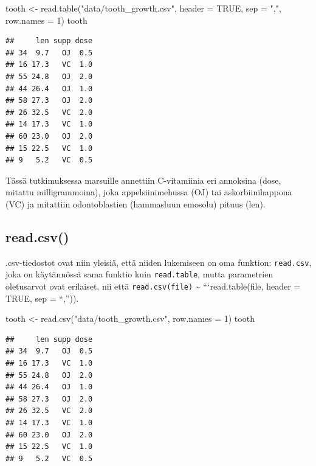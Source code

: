 \documentclass[
]{book}
\newenvironment{Shaded}{\begin{snugshade}}{\end{snugshade}}
\newcommand{\AttributeTok}[1]{\textcolor[rgb]{0.77,0.63,0.00}{#1}}
\newcommand{\ConstantTok}[1]{\textcolor[rgb]{0.00,0.00,0.00}{#1}}
\newcommand{\DecValTok}[1]{\textcolor[rgb]{0.00,0.00,0.81}{#1}}
\newcommand{\FunctionTok}[1]{\textcolor[rgb]{0.00,0.00,0.00}{#1}}
\newcommand{\NormalTok}[1]{#1}
\newcommand{\OtherTok}[1]{\textcolor[rgb]{0.56,0.35,0.01}{#1}}
\newcommand{\StringTok}[1]{\textcolor[rgb]{0.31,0.60,0.02}{#1}}
\begin{document}
\begin{Shaded}
\begin{Highlighting}[]
\NormalTok{tooth }\OtherTok{\textless{}{-}} \FunctionTok{read.table}\NormalTok{(}\StringTok{"data/tooth\_growth.csv"}\NormalTok{, }\AttributeTok{header =} \ConstantTok{TRUE}\NormalTok{, }\AttributeTok{sep =} \StringTok{","}\NormalTok{, }\AttributeTok{row.names =} \DecValTok{1}\NormalTok{)}
\NormalTok{tooth}
\end{Highlighting}
\end{Shaded}

\begin{verbatim}
##     len supp dose
## 34  9.7   OJ  0.5
## 16 17.3   VC  1.0
## 55 24.8   OJ  2.0
## 44 26.4   OJ  1.0
## 58 27.3   OJ  2.0
## 26 32.5   VC  2.0
## 14 17.3   VC  1.0
## 60 23.0   OJ  2.0
## 15 22.5   VC  1.0
## 9   5.2   VC  0.5
\end{verbatim}

Tässä tutkimuksessa marsuille annettiin C-vitamiinia eri annoksina (dose, mitattu milligrammoina), joka appelsiinimehussa (OJ) tai askorbiinihappona (VC) ja mitattiin odontoblastien (hammasluun emosolu) pituus (len).

\hypertarget{read.csv}{%
\subsection{read.csv()}\label{read.csv}}

.csv-tiedostot ovat niin yleisiä, että niiden lukemiseen on oma funktion: \texttt{read.csv}, joka on käytännössä sama funktio kuin \texttt{read.table}, mutta parametrien oletusarvot ovat erilaiset, nii että \texttt{read.csv(file)} \textasciitilde{} ```read.table(file, header = TRUE, sep = ``,'')).

\begin{Shaded}
\begin{Highlighting}[]
\NormalTok{tooth }\OtherTok{\textless{}{-}} \FunctionTok{read.csv}\NormalTok{(}\StringTok{"data/tooth\_growth.csv"}\NormalTok{, }\AttributeTok{row.names =} \DecValTok{1}\NormalTok{)}
\NormalTok{tooth}
\end{Highlighting}
\end{Shaded}

\begin{verbatim}
##     len supp dose
## 34  9.7   OJ  0.5
## 16 17.3   VC  1.0
## 55 24.8   OJ  2.0
## 44 26.4   OJ  1.0
## 58 27.3   OJ  2.0
## 26 32.5   VC  2.0
## 14 17.3   VC  1.0
## 60 23.0   OJ  2.0
## 15 22.5   VC  1.0
## 9   5.2   VC  0.5
\end{verbatim}
\end{document}
